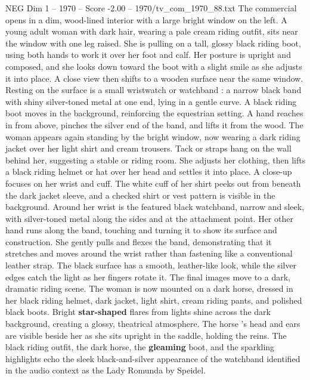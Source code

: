 \begin{textsample}{NEG Dim 1 – 1970 – Score -2.00 – 1970/tv\_com\_1970\_88.txt}  \label{ex:f1_neg_032}
The commercial opens in a dim, wood-lined interior with a large bright window on the left.
A young adult woman with dark hair, wearing a pale cream riding outfit, sits near the window with one leg raised.
She is pulling on a tall, glossy black riding boot, using both hands to work it over her foot and calf.
Her posture is upright and composed, and she looks down toward the boot with a slight smile as she adjusts it into place.
A close view then shifts to a wooden surface near the same window.
Resting on the surface is a small wristwatch or watchband : a narrow black band with shiny silver-toned metal at one end, lying in a gentle curve.
A black riding boot moves in the background, reinforcing the equestrian setting.
A hand reaches in from above, pinches the silver end of the band, and lifts it from the wood.
The woman appears again standing by the bright window, now wearing a dark riding jacket over her light shirt and cream trousers.
Tack or straps hang on the wall behind her, suggesting a stable or riding room.
She adjusts her clothing, then lifts a black riding helmet or hat over her head and settles it into place.
A close-up focuses on her wrist and cuff.
The white cuff of her shirt peeks out from beneath the dark jacket sleeve, and a checked shirt or vest pattern is visible in the background.
Around her wrist is the featured black watchband, narrow and sleek, with silver-toned metal along the sides and at the attachment point.
Her other hand runs along the band, touching and turning it to show its surface and construction.
She gently pulls and flexes the band, demonstrating that it stretches and moves around the wrist rather than fastening like a conventional leather strap.
The black surface has a smooth, leather-like look, while the silver edges catch the light as her fingers rotate it.
The final images move to a dark, dramatic riding scene.
The woman is now mounted on a dark horse, dressed in her black riding helmet, dark jacket, light shirt, cream riding pants, and polished black boots.
Bright \textbf{star-shaped} flares from lights shine across the dark background, creating a glossy, theatrical atmosphere.
The horse ’s head and ears are visible beside her as she sits upright in the saddle, holding the reins.
The black riding outfit, the dark horse, the \textbf{gleaming} boot, and the sparkling highlights echo the sleek black-and-silver appearance of the watchband identified in the audio context as the Lady Romunda by Speidel.

\end{textsample}
